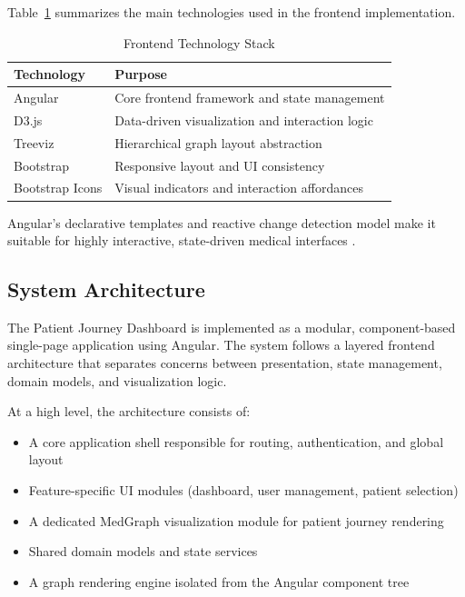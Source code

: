 \documentclass{article}
\begin{document}
Table~\ref{tab:frontend_stack} summarizes the main technologies used in the
frontend implementation.

\begin{table}[h]
    \centering
    \caption{Frontend Technology Stack}
    \label{tab:frontend_stack}
    \begin{tabular}{|l|l|}
        \hline
        \textbf{Technology} & \textbf{Purpose}                                \\
        \hline
        Angular             & Core frontend framework and state management    \\
        D3.js               & Data-driven visualization and interaction logic \\
        Treeviz             & Hierarchical graph layout abstraction           \\
        Bootstrap           & Responsive layout and UI consistency            \\
        Bootstrap Icons     & Visual indicators and interaction affordances   \\
        \hline
    \end{tabular}
\end{table}

Angular’s declarative templates and reactive change detection model make it
suitable for highly interactive, state-driven medical interfaces
\cite{angularDocs}.

\subsection{System Architecture}
\label{sec:system-architecture}

The Patient Journey Dashboard is implemented as a modular, component-based
single-page application using Angular. The system follows a layered frontend
architecture that separates concerns between presentation, state management,
domain models, and visualization logic.

At a high level, the architecture consists of:
\begin{itemize}
    \item A core application shell responsible for routing, authentication, and global
          layout
    \item Feature-specific UI modules (dashboard, user management, patient selection)
    \item A dedicated MedGraph visualization module for patient journey rendering
    \item Shared domain models and state services
    \item A graph rendering engine isolated from the Angular component tree
\end{itemize}
\end{document}
